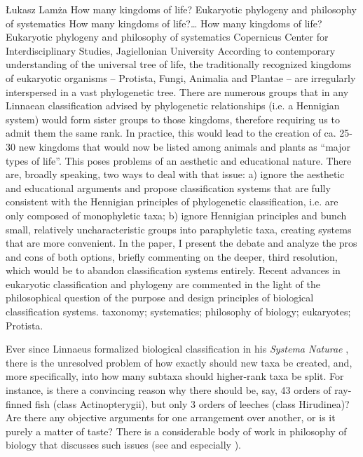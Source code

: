 \begin{artengenv}
	{Łukasz Lamża}
	{How many kingdoms of life? Eukaryotic phylogeny and philosophy of systematics}
	{How many kingdoms of life?\ldots}
	{How many kingdoms of life? Eukaryotic phylogeny and philosophy of systematics}
	{Copernicus Center for Interdisciplinary Studies, Jagiellonian University}
	{According to contemporary understanding of the universal tree of life, the traditionally recognized kingdoms of
		eukaryotic organisms -- Protista, Fungi, Animalia and Plantae -- are irregularly interspersed in a vast phylogenetic
		tree. There are numerous groups that in any Linnaean classification advised by phylogenetic relationships (i.e. a
		Hennigian system) would form sister groups to those kingdoms, therefore requiring us to admit them the same rank. In
		practice, this would lead to the creation of ca. 25-30 new kingdoms that would now be listed among animals and plants
		as ``major types of life''. This poses problems of an aesthetic and educational nature. There are, broadly speaking, two
		ways to deal with that issue: a) ignore the aesthetic and educational arguments and propose classification systems that
		are fully consistent with the Hennigian principles of phylogenetic classification, i.e. are only composed of
		monophyletic taxa; b) ignore Hennigian principles and bunch small, relatively uncharacteristic groups into paraphyletic
		taxa, creating systems that are more convenient. In the paper, I present the debate and analyze the pros and cons of
		both options, briefly commenting on the deeper, third resolution, which would be to abandon classification systems
		entirely. Recent advances in eukaryotic classification and phylogeny are commented in the light of the philosophical
		question of the purpose and design principles of biological classification systems.}
	{taxonomy; systematics; philosophy of biology; eukaryotes; Protista.}



\lettrine[loversize=0.13,lines=2,lraise=-0.05,nindent=0em,findent=0.2pt]%
{E}{}ver since Linnaeus formalized biological classification in his \textit{Systema Naturae}
\parencite{linnaeus_systema_1788},
there is the unresolved problem of how exactly should new taxa be created,
and, more specifically, into how many subtaxa should higher-rank taxa be split. For instance, is there a convincing
reason why there should be, say, 43 orders of ray-finned fish (class Actinopterygii), but only 3 orders of leeches
(class Hirudinea)? Are there any objective arguments for one arrangement over another, or is it purely a matter of
taste? There is a considerable body of work in philosophy of biology that discusses such issues
(see \cite{hull_effect_1965,hull_contemporary_1970,schuh_biological_2011} and especially \cite{mayr_classifications_2002}).


\end{artengenv}
